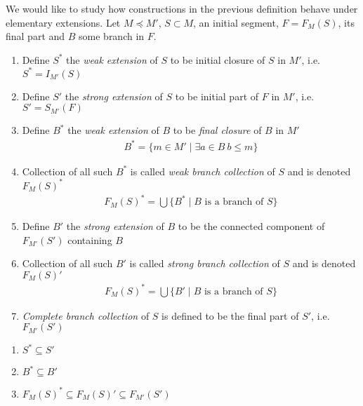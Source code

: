 \documentclass{amsart}
\begin{document}
\begin{Definition}
	We would like to study how constructions in the previous definition behave under elementary extensions. Let $M \preccurlyeq M'$, $S \subset M$, an initial segment, $F = F_M(S)$, its final part and $B$ some branch in $F$.
	\begin{enumerate}
		\item Define $S^*$ the \emph{weak extension} of $S$ to be initial closure of $S$ in $M'$, i.e. $S^* = I_{M'}(S)$
		\item Define $S'$ the \emph{strong extension} of $S$ to be initial part of $F$ in $M'$, i.e. $S' = S_{M'}(F)$
		\item Define $B^*$ the \emph{weak extension} of $B$ to be \emph{final closure} of $B$ in $M'$
		\begin{align*}
			B^* = \{m \in M' \mid \exists a \in B \ b \leq m\}
		\end{align*}
		\item Collection of all such $B^*$ is called \emph{weak branch collection} of $S$ and is denoted $F_M(S)^*$
		\begin{align*}
			F_M(S)^* = \bigcup \{B^* \mid B \text{ is a branch of } S\}
		\end{align*}
		\item Define $B'$ the \emph{strong extension} of $B$ to be the connected component of $F_{M'}(S')$ containing $B$
		\item Collection of all such $B'$ is called \emph{strong branch collection} of $S$ and is denoted $F_M(S)'$
		\begin{align*}
			F_M(S)^* = \bigcup \{B' \mid B \text{ is a branch of } S\}
		\end{align*}
		\item \emph{Complete branch collection} of $S$ is defined to be the final part of $S'$, i.e. $F_{M'}(S')$
	\end{enumerate}
\end{Definition}

\begin{Note}
	\begin{enumerate} Observe following containments. All of them can be strict
		\item $S^* \subseteq S'$
		\item $B^* \subseteq B'$
		\item $F_M(S)^* \subseteq F_M(S)' \subseteq F_{M'}(S')$
	\end{enumerate}
\end{Note}
\end{document}
